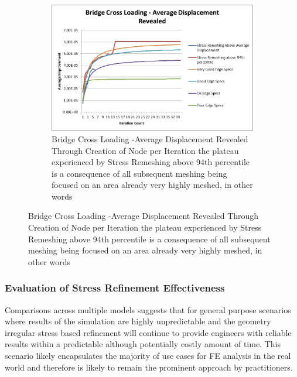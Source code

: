 \begin{figure}[!h]
\centering
\begin{subfigure}{.5\textwidth}
  \centering
  \includegraphics[width=1.5\linewidth]{../Graphics/Graphs/BridgeCrossLoadingAverageDisplacementRevealed.png}
  \caption{Bridge Cross Loading -Average Displacement Revealed Through Creation of Node per Iteration the plateau experienced by Stress Remeshing above 94th percentile is a consequence of all subsequent meshing being focused on an area already very highly meshed, in other words}
  \label{fig:sub1}
\end{subfigure}%
\label{fig:test}
\end{figure}





\subsubsection{Evaluation of Stress Refinement Effectiveness}
Comparisons across multiple models suggests that for general purpose scenarios where results of the simulation are highly unpredictable and the geometry irregular stress based refinement will continue to provide engineers with reliable results within a predictable although potentially costly amount of time. This scenario likely encapsulates the majority of use cases for FE analysis in the real world and therefore is likely to remain the prominent approach by practitioners.

